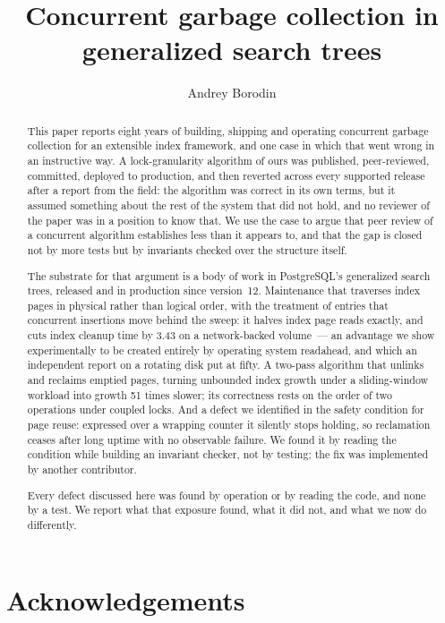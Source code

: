 \documentclass[11pt, a4paper]{article}
\title{Concurrent garbage collection in generalized search trees}
\author{Andrey Borodin}
\date{}
\begin{document}
\maketitle

\begin{abstract}
This paper reports eight years of building, shipping and operating concurrent
garbage collection for an extensible index framework, and one case in which that
went wrong in an instructive way. A lock-granularity algorithm of ours was
published, peer-reviewed, committed, deployed to production, and then reverted
across every supported release after a report from the field: the algorithm was
correct in its own terms, but it assumed something about the rest of the system
that did not hold, and no reviewer of the paper was in a position to know that.
We use the case to argue that peer review of a concurrent algorithm establishes
less than it appears to, and that the gap is closed not by more tests but by
invariants checked over the structure itself.

The substrate for that argument is a body of work in PostgreSQL's generalized
search trees, released and in production since version~12. Maintenance that
traverses index pages in physical rather than logical order, with the treatment
of entries that concurrent insertions move behind the sweep: it halves index page
reads exactly, and cuts index cleanup time by 3.43 on a network-backed volume~---
an advantage we show experimentally to be created entirely by operating system
readahead, and which an independent report on a rotating disk put at fifty. A
two-pass algorithm that unlinks and reclaims emptied pages, turning unbounded
index growth under a sliding-window workload into growth 51 times slower; its
correctness rests on the order of two operations under coupled locks. And a
defect we identified in the safety condition for page reuse: expressed over a wrapping
counter it silently stops holding, so reclamation ceases after long uptime with
no observable failure. We found it by reading the condition while building an
invariant checker, not by testing; the fix was implemented by another
contributor.

Every defect discussed here was found by operation or by reading the code, and
none by a test. We report
what that exposure found, what it did not, and what we now do differently.
\end{abstract}



\section*{Acknowledgements}
\end{document}

